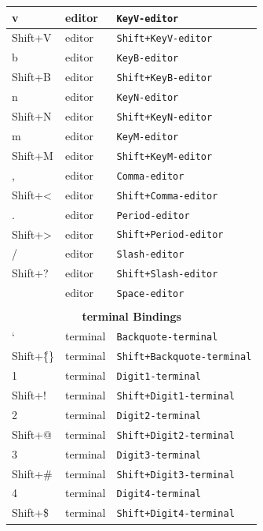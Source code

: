 \documentclass[11pt, a4paper]{article}
\begin{document}
\begin{appendices}
\begin{longtable}{|p{}|p{}|p{}|}
    v & editor & \texttt{KeyV-editor} \\ \hline
    Shift+V & editor & \texttt{Shift+KeyV-editor} \\ \hline
    b & editor & \texttt{KeyB-editor} \\ \hline
    Shift+B & editor & \texttt{Shift+KeyB-editor} \\ \hline
    n & editor & \texttt{KeyN-editor} \\ \hline
    Shift+N & editor & \texttt{Shift+KeyN-editor} \\ \hline
    m & editor & \texttt{KeyM-editor} \\ \hline
    Shift+M & editor & \texttt{Shift+KeyM-editor} \\ \hline
    , & editor & \texttt{Comma-editor} \\ \hline
    Shift+< & editor & \texttt{Shift+Comma-editor} \\ \hline
    . & editor & \texttt{Period-editor} \\ \hline
    Shift+> & editor & \texttt{Shift+Period-editor} \\ \hline
    / & editor & \texttt{Slash-editor} \\ \hline
    Shift+? & editor & \texttt{Shift+Slash-editor} \\ \hline
      & editor & \texttt{Space-editor} \\ \hline
    \multicolumn{3}{|c|}{} \\ \hline
    \multicolumn{3}{|c|}{\textbf{terminal Bindings}} \\ \hline
    ` & terminal & \texttt{Backquote-terminal} \\ \hline
    Shift+\~\{\} & terminal & \texttt{Shift+Backquote-terminal} \\ \hline
    1 & terminal & \texttt{Digit1-terminal} \\ \hline
    Shift+! & terminal & \texttt{Shift+Digit1-terminal} \\ \hline
    2 & terminal & \texttt{Digit2-terminal} \\ \hline
    Shift+@ & terminal & \texttt{Shift+Digit2-terminal} \\ \hline
    3 & terminal & \texttt{Digit3-terminal} \\ \hline
    Shift+\# & terminal & \texttt{Shift+Digit3-terminal} \\ \hline
    4 & terminal & \texttt{Digit4-terminal} \\ \hline
    Shift+\$ & terminal & \texttt{Shift+Digit4-terminal} \\ \hline

\end{longtable}
\end{appendices}
\end{document}
